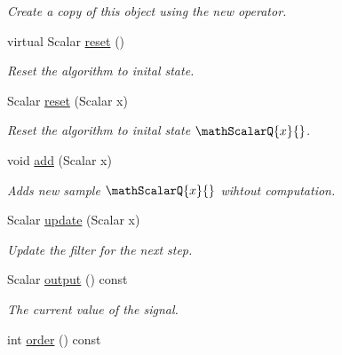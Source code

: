 \begin{DoxyCompactItemize}
\begin{DoxyCompactList}\small\item\em Create a copy of this object using the new operator. \end{DoxyCompactList}\item 
virtual Scalar \hyperlink{classow__core_1_1ScalarButterWorthFilter_a1dd30f8c8be1b5def440a332bded798a}{reset} ()
\begin{DoxyCompactList}\small\item\em Reset the algorithm to inital state. \end{DoxyCompactList}\item 
Scalar \hyperlink{classow__core_1_1ScalarButterWorthFilter_a67ffaf18d349a7e187b220ce56e3827e}{reset} (Scalar x)
\begin{DoxyCompactList}\small\item\em Reset the algorithm to inital state $\mathScalarQ{x}{}$. \end{DoxyCompactList}\item 
void \hyperlink{classow__core_1_1ScalarButterWorthFilter_a6ec4f0a7934eb5cc92507391c9066788}{add} (Scalar x)
\begin{DoxyCompactList}\small\item\em Adds new sample $\mathScalarQ{x}{}$ wihtout computation. \end{DoxyCompactList}\item 
Scalar \hyperlink{classow__core_1_1ScalarButterWorthFilter_ac34d0ff2d3127a2d4af585fee852c6cd}{update} (Scalar x)\hypertarget{classow__core_1_1ScalarButterWorthFilter_ac34d0ff2d3127a2d4af585fee852c6cd}{}\label{classow__core_1_1ScalarButterWorthFilter_ac34d0ff2d3127a2d4af585fee852c6cd}

\begin{DoxyCompactList}\small\item\em Update the filter for the next step. \end{DoxyCompactList}\item 
Scalar \hyperlink{classow__core_1_1ScalarButterWorthFilter_a4bf09704d1728d06d336deed76d02a22}{output} () const \hypertarget{classow__core_1_1ScalarButterWorthFilter_a4bf09704d1728d06d336deed76d02a22}{}\label{classow__core_1_1ScalarButterWorthFilter_a4bf09704d1728d06d336deed76d02a22}

\begin{DoxyCompactList}\small\item\em The current value of the signal. \end{DoxyCompactList}\item 
int \hyperlink{classow__core_1_1ScalarButterWorthFilter_a9bc80a1619931505c290bdb8dae15aba}{order} () const \hypertarget{classow__core_1_1ScalarButterWorthFilter_a9bc80a1619931505c290bdb8dae15aba}{}\label{classow__core_1_1ScalarButterWorthFilter_a9bc80a1619931505c290bdb8dae15aba}


\end{DoxyCompactItemize}
